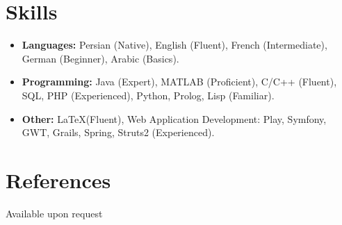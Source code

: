 \documentclass[a4paper]{article}
\theoremstyle{definition}
\begin{document}
\section{Skills}
\begin{itemize}
\item \textbf{Languages:} Persian (Native), English (Fluent), French (Intermediate), German (Beginner), Arabic (Basics).

\item \textbf{Programming:} Java (Expert), MATLAB (Proficient), C/C++ (Fluent), SQL, PHP (Experienced), Python, Prolog, Lisp (Familiar).
\item \textbf{Other:} \LaTeX \hspace*{2pt}(Fluent), Web Application Development: Play, Symfony, GWT, Grails, Spring, Struts2 (Experienced).


\end{itemize}

\section{References}

Available upon request
%
%
%
%
%
%
%
\end{document}
